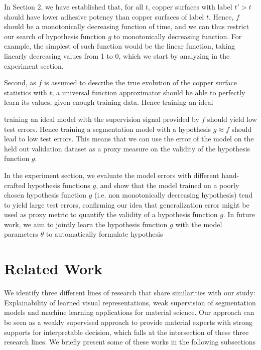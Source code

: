 \documentclass[10pt,twocolumn,letterpaper]{article}
\begin{document}
In Section 2, we have established that, for all $t$, 
copper surfaces with label $t' > t$ should have lower adhesive potency than copper surfaces of label $t$.
Hence, $f$ should be a monotonically decreasing function of time,
and we can thus restrict our search of hypothesis function $g$ to monotonically decreasing function.
For example, the simplest of such function would be the linear function, 
taking linearly decreasing values from 1 to 0,
which we start by analyzing in the experiment section.

Second, as $f$ is assumed to describe the true evolution of the copper surface statistics with $t$,
a universal function approximator should be able to perfectly learn its values, given enough training data.
Hence training an ideal 

training an ideal model with the supervision signal provided by $f$ should yield low test errors.
Hence training a segmentation model with a hypothesis $g \approx f$ should lead to low test errors.
This means that we can use the error of the model on the held out validation dataset as a proxy measure on
the validity of the hypothesis function $g$.

In the experiment section, we evaluate the model errors with different hand-crafted hypothesis functions $g$,
and show that the model trained on a poorly chosen hypothesis function $g$ (i.e. non monotonically decreasing hypothesis) 
tend to yield large test errors, confirming our idea that generalization error might be used as proxy metric
to quantify the validity of a hypothesis function $g$.
In future work, we aim to jointly learn the hypothesis function $g$ with the model parameters $\theta$ to automatically
formulate hypothesis


\section{Related Work}

We identify three different lines of research that share similarities with our study:
Explainability of learned visual representations, 
weak supervision of segmentation models and 
machine learning applications for material science.
Our approach can be seen as a weakly supervised approach to provide material 
experts with strong supports for interpretable decision, 
which falls at the intersection of these three research lines.
We briefly present some of these works in the following subsections
\end{document}
